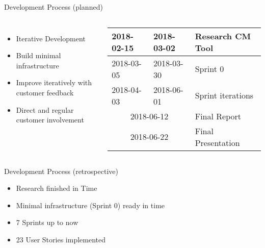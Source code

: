 \begin{frame}{Development Process (planned)}
	
	\begin{columns}[T,onlytextwidth]
		
		\begin{itemize}
			\item Iterative Development
			\item Build minimal infrastructure
			\item Improve iteratively with customer feedback
			\item Direct and regular customer involvement
		\end{itemize}
		
		
		\begin{table}[H]
			\centering
			\begin{tabular}{|l|l|l|}
				\hline
				2018-02-15 & 2018-03-02 & Research CM Tool \\ \hline
				2018-03-05 & 2018-03-30 & Sprint 0 \\ \hline
				2018-04-03 & 2018-06-01 & Sprint iterations \\ \hline
				\multicolumn{2}{|c|}{2018-06-12} & Final Report \\ \hline
				\multicolumn{2}{|c|}{2018-06-22} & Final Presentation \\ \hline
			\end{tabular}
		\end{table}
	\end{columns}
\end{frame}


\begin{frame}{Development Process (retrospective)}
	\begin{itemize}
		\item Research finished in Time
		\item Minimal infrastructure (Sprint 0) ready in time
		\item 7 Sprints up to now
		\item 23 User Stories implemented
	\end{itemize}
\end{frame}



